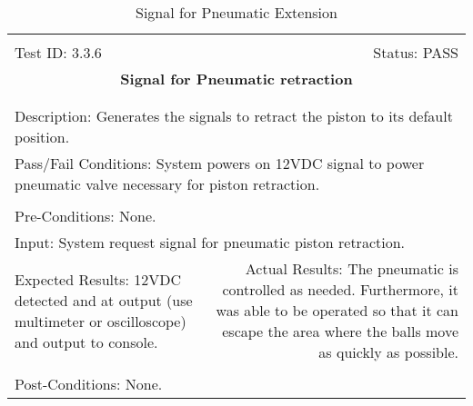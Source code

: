 \documentclass[titlepage]{article}
\begin{document}
\begin{center}
\begin{table}[h!]
\begin{tabular}{|l r|}\hline&\\[-2mm]
	Test ID: 3.3.6	&Status: PASS\\[-3mm]
	\multicolumn{2}{|c|}{\textbf{\large{Signal for Pneumatic retraction}}}\\&\\\hline&\\[-3mm]
	\multicolumn{2}{|p{\textwidth}|}{Description: Generates the signals to retract the piston to its default position.}\\\hline
	\multicolumn{2}{|p{\textwidth}|}{Pass/Fail Conditions: System powers on 12VDC signal to power pneumatic valve necessary for piston retraction.}\\[1mm]\hline&\\[-3mm]
	\multicolumn{2}{|p{\textwidth}|}{Pre-Conditions: None.}\\[4mm]
	\multicolumn{2}{|p{\textwidth}|}{Input: System request signal for pneumatic piston retraction.}\\[2mm]\hline
	\multicolumn{1}{|p{0.49\textwidth}}{Expected Results: 12VDC detected and at output (use multimeter or oscilloscope) and output to console.}	&\multicolumn{1}{|p{0.45\textwidth}|}{Actual Results: The pneumatic is controlled as needed. Furthermore, it was able to be operated so that it can escape the area where the balls move as quickly as possible.}\\\hline&\\[-3mm]
	\multicolumn{2}{|p{\textwidth}|}{Post-Conditions: None.}\\\hline
\end{tabular}
\caption{Signal for Pneumatic Extension}
\end{table}
\end{center}
\end{document}
